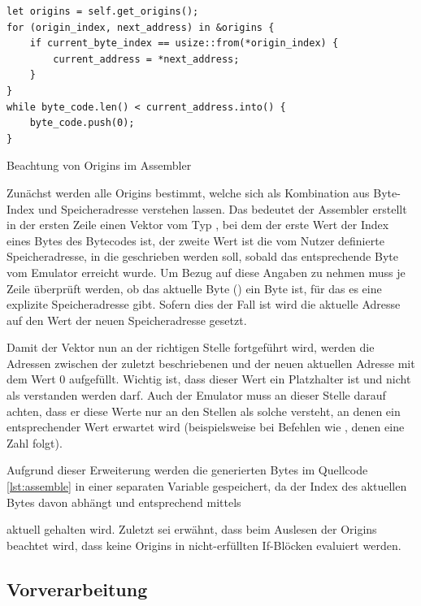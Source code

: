 \begin{listing}[th]
\begin{verbatim}
let origins = self.get_origins();
for (origin_index, next_address) in &origins {
	if current_byte_index == usize::from(*origin_index) {
        current_address = *next_address;
    }
}
while byte_code.len() < current_address.into() {
    byte_code.push(0);
}
\end{verbatim}
\caption{Beachtung von Origins im Assembler}
\label{lst:ass:origins}
\end{listing}

Zunächst werden alle Origins bestimmt, welche sich als Kombination aus Byte-Index und Speicheradresse verstehen lassen. Das bedeutet der Assembler erstellt in der ersten Zeile einen Vektor vom Typ , bei dem der erste Wert der Index eines Bytes des Bytecodes ist, der zweite Wert ist die vom Nutzer definierte Speicheradresse, in die geschrieben werden soll, sobald das entsprechende Byte vom Emulator erreicht wurde. Um Bezug auf diese Angaben zu nehmen muss je Zeile überprüft werden, ob das aktuelle Byte () ein Byte ist, für das es eine explizite Speicheradresse gibt. Sofern dies der Fall ist wird die aktuelle Adresse auf den Wert der neuen Speicheradresse gesetzt. 

Damit der Vektor nun an der richtigen Stelle fortgeführt wird, werden die Adressen zwischen der zuletzt beschriebenen und der neuen aktuellen Adresse mit dem Wert 0 aufgefüllt. Wichtig ist, dass dieser Wert ein Platzhalter ist und nicht als \grqq{} verstanden werden darf. Auch der Emulator muss an dieser Stelle darauf achten, dass er diese Werte nur an den Stellen als solche versteht, an denen ein entsprechender Wert erwartet wird (beispielsweise bei Befehlen wie , denen eine Zahl folgt).

Aufgrund dieser Erweiterung werden die generierten Bytes im Quellcode \ref{lst:assemble} in einer separaten Variable gespeichert, da der Index des aktuellen Bytes davon abhängt und entsprechend mittels

\qquad {}

aktuell gehalten wird. Zuletzt sei erwähnt, dass beim Auslesen der Origins beachtet wird, dass keine Origins in nicht-erfüllten If-Blöcken evaluiert werden.

\subsection{Vorverarbeitung}\label{chap:preprocessor}

